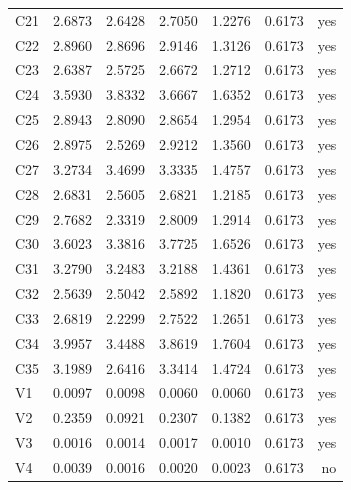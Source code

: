 \begin{longtable}{lrrrrrr}
C21 & 2.6873 & 2.6428 & 2.7050 & 1.2276 & 0.6173 & yes \\
C22 & 2.8960 & 2.8696 & 2.9146 & 1.3126 & 0.6173 & yes \\
C23 & 2.6387 & 2.5725 & 2.6672 & 1.2712 & 0.6173 & yes \\
C24 & 3.5930 & 3.8332 & 3.6667 & 1.6352 & 0.6173 & yes \\
C25 & 2.8943 & 2.8090 & 2.8654 & 1.2954 & 0.6173 & yes \\
C26 & 2.8975 & 2.5269 & 2.9212 & 1.3560 & 0.6173 & yes \\
C27 & 3.2734 & 3.4699 & 3.3335 & 1.4757 & 0.6173 & yes \\
C28 & 2.6831 & 2.5605 & 2.6821 & 1.2185 & 0.6173 & yes \\
C29 & 2.7682 & 2.3319 & 2.8009 & 1.2914 & 0.6173 & yes \\
C30 & 3.6023 & 3.3816 & 3.7725 & 1.6526 & 0.6173 & yes \\
C31 & 3.2790 & 3.2483 & 3.2188 & 1.4361 & 0.6173 & yes \\
C32 & 2.5639 & 2.5042 & 2.5892 & 1.1820 & 0.6173 & yes \\
C33 & 2.6819 & 2.2299 & 2.7522 & 1.2651 & 0.6173 & yes \\
C34 & 3.9957 & 3.4488 & 3.8619 & 1.7604 & 0.6173 & yes \\
C35 & 3.1989 & 2.6416 & 3.3414 & 1.4724 & 0.6173 & yes \\
V1 & 0.0097 & 0.0098 & 0.0060 & 0.0060 & 0.6173 & yes \\
V2 & 0.2359 & 0.0921 & 0.2307 & 0.1382 & 0.6173 & yes \\
V3 & 0.0016 & 0.0014 & 0.0017 & 0.0010 & 0.6173 & yes \\
V4 & 0.0039 & 0.0016 & 0.0020 & 0.0023 & 0.6173 & no \\
\bottomrule
\end{longtable}
\endgroup

